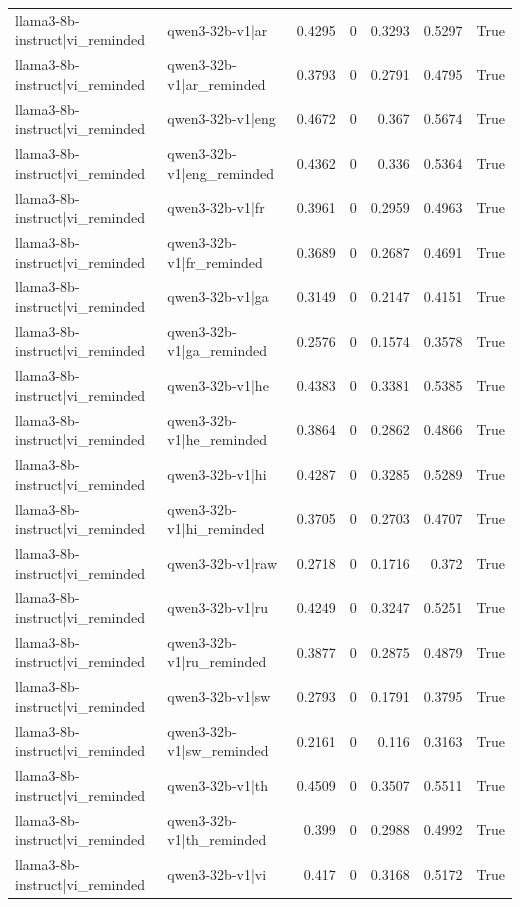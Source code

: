 \begin{table}
\begin{tabular}{l l r r r r l}
llama3-8b-instruct|vi_reminded & qwen3-32b-v1|ar & 0.4295 & 0 & 0.3293 & 0.5297 & True \\
llama3-8b-instruct|vi_reminded & qwen3-32b-v1|ar_reminded & 0.3793 & 0 & 0.2791 & 0.4795 & True \\
llama3-8b-instruct|vi_reminded & qwen3-32b-v1|eng & 0.4672 & 0 & 0.367 & 0.5674 & True \\
llama3-8b-instruct|vi_reminded & qwen3-32b-v1|eng_reminded & 0.4362 & 0 & 0.336 & 0.5364 & True \\
llama3-8b-instruct|vi_reminded & qwen3-32b-v1|fr & 0.3961 & 0 & 0.2959 & 0.4963 & True \\
llama3-8b-instruct|vi_reminded & qwen3-32b-v1|fr_reminded & 0.3689 & 0 & 0.2687 & 0.4691 & True \\
llama3-8b-instruct|vi_reminded & qwen3-32b-v1|ga & 0.3149 & 0 & 0.2147 & 0.4151 & True \\
llama3-8b-instruct|vi_reminded & qwen3-32b-v1|ga_reminded & 0.2576 & 0 & 0.1574 & 0.3578 & True \\
llama3-8b-instruct|vi_reminded & qwen3-32b-v1|he & 0.4383 & 0 & 0.3381 & 0.5385 & True \\
llama3-8b-instruct|vi_reminded & qwen3-32b-v1|he_reminded & 0.3864 & 0 & 0.2862 & 0.4866 & True \\
llama3-8b-instruct|vi_reminded & qwen3-32b-v1|hi & 0.4287 & 0 & 0.3285 & 0.5289 & True \\
llama3-8b-instruct|vi_reminded & qwen3-32b-v1|hi_reminded & 0.3705 & 0 & 0.2703 & 0.4707 & True \\
llama3-8b-instruct|vi_reminded & qwen3-32b-v1|raw & 0.2718 & 0 & 0.1716 & 0.372 & True \\
llama3-8b-instruct|vi_reminded & qwen3-32b-v1|ru & 0.4249 & 0 & 0.3247 & 0.5251 & True \\
llama3-8b-instruct|vi_reminded & qwen3-32b-v1|ru_reminded & 0.3877 & 0 & 0.2875 & 0.4879 & True \\
llama3-8b-instruct|vi_reminded & qwen3-32b-v1|sw & 0.2793 & 0 & 0.1791 & 0.3795 & True \\
llama3-8b-instruct|vi_reminded & qwen3-32b-v1|sw_reminded & 0.2161 & 0 & 0.116 & 0.3163 & True \\
llama3-8b-instruct|vi_reminded & qwen3-32b-v1|th & 0.4509 & 0 & 0.3507 & 0.5511 & True \\
llama3-8b-instruct|vi_reminded & qwen3-32b-v1|th_reminded & 0.399 & 0 & 0.2988 & 0.4992 & True \\
llama3-8b-instruct|vi_reminded & qwen3-32b-v1|vi & 0.417 & 0 & 0.3168 & 0.5172 & True \\

\end{tabular}
\end{table}
